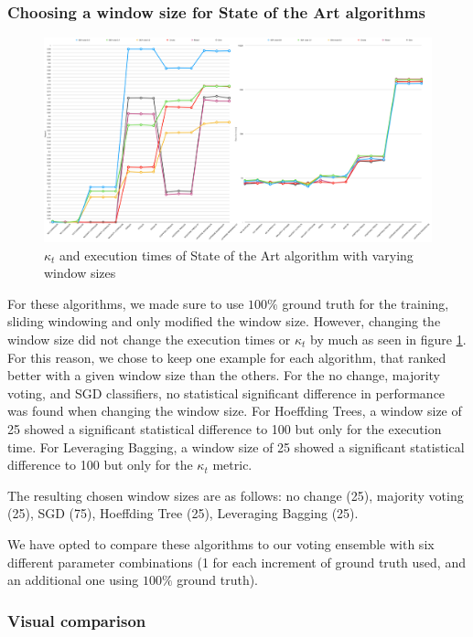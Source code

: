 \documentclass[runningheads]{llncs}
\begin{document}
\subsubsection{Choosing a window size for State of the Art algorithms}

\begin{figure}
  \includegraphics[width=\linewidth]{./images/chapter5/compare_sota}
\caption{\label{fig:raw_compare_sota}$\kappa_t$ and execution times of State of the Art algorithm with varying window sizes}
\end{figure}

For these algorithms, we made sure to use $100\%$ ground truth for the training, sliding windowing and only modified the window size. However, changing the window size did not change the execution times or $\kappa_t$ by much as seen in figure \ref{fig:raw_compare_sota}. For this reason, we chose to keep one example for each algorithm, that ranked better with a given window size than the others. For the no change, majority voting, and SGD classifiers, no statistical significant difference in performance was found when changing the window size. For Hoeffding Trees, a window size of 25 showed a significant statistical difference to 100 but only for the execution time. For Leveraging Bagging, a window size of 25 showed a significant statistical difference to 100 but only for the $\kappa_t$ metric.

The resulting chosen window sizes are as follows: no change (25),  majority voting (25), SGD (75), Hoeffding Tree (25), Leveraging Bagging (25).

We have opted to compare these algorithms to our voting ensemble with six different parameter combinations (1 for each increment of ground truth used, and an additional one using $100\%$ ground truth).

\subsubsection{Visual comparison}
\end{document}
